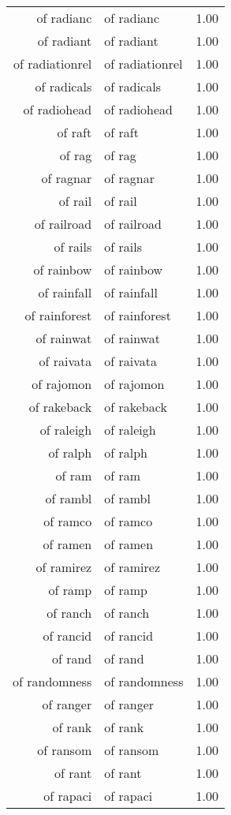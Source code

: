 \begin{table}[ht]
\begin{tabular}{rlr}
  of radianc & of radianc & 1.00 \\ 
  of radiant & of radiant & 1.00 \\ 
  of radiationrel & of radiationrel & 1.00 \\ 
  of radicals & of radicals & 1.00 \\ 
  of radiohead & of radiohead & 1.00 \\ 
  of raft & of raft & 1.00 \\ 
  of rag & of rag & 1.00 \\ 
  of ragnar & of ragnar & 1.00 \\ 
  of rail & of rail & 1.00 \\ 
  of railroad & of railroad & 1.00 \\ 
  of rails & of rails & 1.00 \\ 
  of rainbow & of rainbow & 1.00 \\ 
  of rainfall & of rainfall & 1.00 \\ 
  of rainforest & of rainforest & 1.00 \\ 
  of rainwat & of rainwat & 1.00 \\ 
  of raivata & of raivata & 1.00 \\ 
  of rajomon & of rajomon & 1.00 \\ 
  of rakeback & of rakeback & 1.00 \\ 
  of raleigh & of raleigh & 1.00 \\ 
  of ralph & of ralph & 1.00 \\ 
  of ram & of ram & 1.00 \\ 
  of rambl & of rambl & 1.00 \\ 
  of ramco & of ramco & 1.00 \\ 
  of ramen & of ramen & 1.00 \\ 
  of ramirez & of ramirez & 1.00 \\ 
  of ramp & of ramp & 1.00 \\ 
  of ranch & of ranch & 1.00 \\ 
  of rancid & of rancid & 1.00 \\ 
  of rand & of rand & 1.00 \\ 
  of randomness & of randomness & 1.00 \\ 
  of ranger & of ranger & 1.00 \\ 
  of rank & of rank & 1.00 \\ 
  of ransom & of ransom & 1.00 \\ 
  of rant & of rant & 1.00 \\ 
  of rapaci & of rapaci & 1.00 \\ 

\end{tabular}
\end{table}
